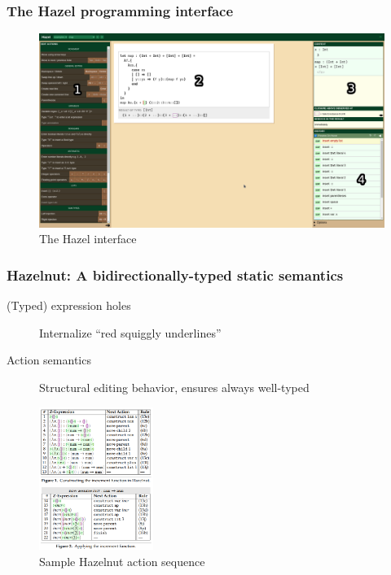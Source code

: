 \documentclass{beamer}
\begin{document}
\begin{frame}
  \frametitle{The Hazel programming interface}

  \begin{figure}
    \centering
    \includegraphics[width=.9\linewidth]{thesis/img/hazel_ui_annot.png}
    \caption{The Hazel interface}
    \label{fig:hazel-ui}
  \end{figure}

\end{frame}

\begin{frame}
  \frametitle{Hazelnut: A bidirectionally-typed static semantics}

  \begin{description}
  \item[(Typed) expression holes] Internalize ``red squiggly underlines''
  \item[Action semantics] Structural editing behavior, ensures always well-typed
  \end{description}

  \begin{figure}
    \centering
    \includegraphics[width=10em]{thesis/img/hazelnut_actions}
    \caption{Sample Hazelnut action sequence \cite{conf/popl/Hazelnut17}}
    \label{fig:hazelnut-action-sequence}
  \end{figure}
\end{frame}
\end{document}
